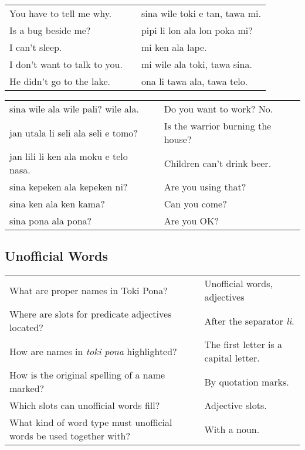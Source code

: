 \begin{supertabular}{p{5,5cm}|ll}
    You have to tell me why.     &  & sina wile toki e tan, tawa mi. \\ %
    Is a bug beside me?          &  & pipi li lon ala lon poka mi?   \\ %
    I can't sleep.               &  & mi ken ala lape.               \\ %
    I don't want to talk to you. &  & mi wile ala toki, tawa sina.   \\ %
    He didn't go to the lake.    &  & ona li tawa ala, tawa telo.    \\ %
\end{supertabular}

\begin{supertabular}{p{5,5cm}|ll}
    sina wile ala wile pali? wile ala.    &  & Do you want to work? No.          \\
    jan utala li seli ala seli e tomo?    &  & Is the warrior burning the house? \\
    jan lili li ken ala moku e telo nasa. &  & Children can't drink beer.        \\
    sina kepeken ala kepeken ni?          &  & Are you using that?               \\
    sina ken ala ken kama?                &  & Can you come?                     \\
    sina pona ala pona?                   &  & Are you OK?                       \\
\end{supertabular}

\newpage
%
\subsection*{Unofficial Words}
\label{'unofficial_words_answers'}
%
\begin{supertabular}{p{5,5cm}|ll}
    What are proper names in Toki Pona?                                 &  & Unofficial words, adjectives          \\ %
    Where are slots for predicate adjectives located?                   &  & After the separator \textit{li}.      \\ %
    How are names in \textit{toki pona} highlighted?                    &  & The first letter is a capital letter. \\ %
    How is the original spelling of a name marked?                      &  & By quotation marks.                   \\ %
    Which slots can unofficial words fill?                              &  & Adjective slots.                      \\ %
    What kind of word type must unofficial words be used together with? &  & With a noun.                          \\ %
\end{supertabular}

